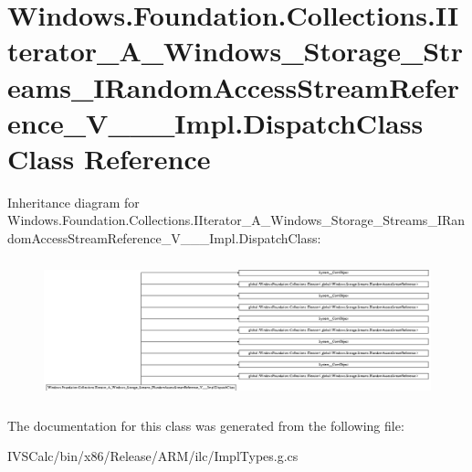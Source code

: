 \hypertarget{class_windows_1_1_foundation_1_1_collections_1_1_i_iterator___a___windows___storage___streams___744cce218fe6a6092e789ba1e595bb65}{}\section{Windows.\+Foundation.\+Collections.\+I\+Iterator\+\_\+\+A\+\_\+\+Windows\+\_\+\+Storage\+\_\+\+Streams\+\_\+\+I\+Random\+Access\+Stream\+Reference\+\_\+\+V\+\_\+\+\_\+\+\_\+\+Impl.\+Dispatch\+Class Class Reference}
\label{class_windows_1_1_foundation_1_1_collections_1_1_i_iterator___a___windows___storage___streams___744cce218fe6a6092e789ba1e595bb65}
Inheritance diagram for Windows.\+Foundation.\+Collections.\+I\+Iterator\+\_\+\+A\+\_\+\+Windows\+\_\+\+Storage\+\_\+\+Streams\+\_\+\+I\+Random\+Access\+Stream\+Reference\+\_\+\+V\+\_\+\+\_\+\+\_\+\+Impl.\+Dispatch\+Class\+:\begin{figure}[H]
\begin{center}
\leavevmode
\includegraphics[height=4.031414cm]{class_windows_1_1_foundation_1_1_collections_1_1_i_iterator___a___windows___storage___streams___744cce218fe6a6092e789ba1e595bb65}
\end{center}
\end{figure}


The documentation for this class was generated from the following file\+:\begin{DoxyCompactItemize}
\item 
I\+V\+S\+Calc/bin/x86/\+Release/\+A\+R\+M/ilc/Impl\+Types.\+g.\+cs\end{DoxyCompactItemize}
